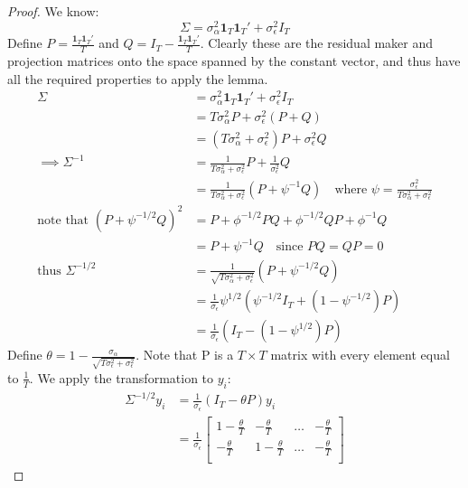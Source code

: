 \documentclass[DIV=14,titlepage=false]{scrreprt}
\begin{document}
\begin{proof}
    We know:
    \[
        \Sigma = \sigma^2_{\alpha}\mathbf{1}_T\mathbf{1}_T' + \sigma^2_{\epsilon}I_T
    \]
    Define $P = \frac{\mathbf{1}_T\mathbf{1}_T'}{T}$ and $Q = I_T - \frac{\mathbf{1}_T\mathbf{1}_T'}{T}$. Clearly these are the residual maker and projection matrices onto the space spanned by the constant vector, and thus have all the required properties to apply the lemma.
    \begin{align*}
        \Sigma &= \sigma^2_{\alpha}\mathbf{1}_T\mathbf{1}_T' + \sigma^2_{\epsilon}I_T\\
        &= T \sigma^2_{\alpha}P + \sigma^2_{\epsilon}(P+Q)\\
        &= (T \sigma^2_{\alpha} + \sigma^2_{\epsilon})P + \sigma^2_{\epsilon}Q\\
        \implies \Sigma^{-1} &= \frac{1}{T \sigma^2_{\alpha} + \sigma^2_{\epsilon}}P + \frac{1}{\sigma^2_{\epsilon}}Q\\
        &= \frac{1}{T \sigma^2_{\alpha} + \sigma^2_{\epsilon}}\left( P + \psi^{-1}Q\right)\quad \text {where } \psi = \frac{\sigma^2_{\epsilon}}{T \sigma^2_{\alpha} + \sigma^2_{\epsilon}}\\
        \text{note that } (P + \psi^{-1/2}Q)^2 &= P + \phi^{-1/2} PQ + \phi^{-1/2} QP + \phi^{-1}Q\\
        &= P + \psi^{-1}Q \quad \text{since } PQ = QP = 0\\
        \text{thus } \Sigma^{-1/2} &= \frac{1}{\sqrt{T \sigma^2_{\alpha} + \sigma^2_{\epsilon}}}\left( P + \psi^{-1/2}Q\right)\\
        &= \frac{1}{\sigma_\epsilon}\psi^{1/2}\left(\psi^{-1/2} I_T +(1-\psi^{-1/2})P\right)\\
        &= \frac{1}{\sigma_\epsilon}\left( I_T - (1-\psi^{1/2})P\right)
    \end{align*}
    Define $\theta = 1-\frac{\sigma_\alpha}{\sqrt{T \sigma^2_{\epsilon} + \sigma^2_{\epsilon}}}$. Note that P is a $T \times T$ matrix with every element equal to $\frac{1}{T}$. We apply the transformation to $y_i$:
    \begin{align*}
        \Sigma^{-1/2}y_i &= \frac{1}{\sigma_\epsilon}\left( I_T - \theta P\right)y_i\\
        &= \frac{1}{\sigma_\epsilon} \begin{bmatrix}
            1-\frac{\theta}{T} & -\frac{\theta}{T} & \ldots & -\frac{\theta}{T} \\
            -\frac{\theta}{T} & 1-\frac{\theta}{T} & \ldots & -\frac{\theta}{T} \\

\end{bmatrix}
\end{align*}
\end{proof}
\end{document}
